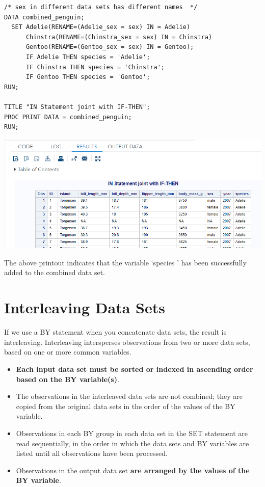 \documentclass[
]{book}
\begin{document}
\begin{verbatim}
/* sex in different data sets has different names  */
DATA combined_penguin;
  SET Adelie(RENAME=(Adelie_sex = sex) IN = Adelie)
      Chinstra(RENAME=(Chinstra_sex = sex) IN = Chinstra)
      Gentoo(RENAME=(Gentoo_sex = sex) IN = Gentoo);
      IF Adelie THEN species = 'Adelie';
      IF Chinstra THEN species = 'Chinstra';
      IF Gentoo THEN species = 'Gentoo';
RUN; 

TITLE "IN Statement joint with IF-THEN";
PROC PRINT DATA = combined_penguin;
RUN;
\end{verbatim}

\begin{center}\includegraphics[width=1\linewidth]{img08/w08-IN-Indicator-IF-THEN} \end{center}

The above printout indicates that the variable `species ' has been successfully added to the combined data set.

\hypertarget{interleaving-data-sets}{%
\section{Interleaving Data Sets}\label{interleaving-data-sets}}

If we use a BY statement when you concatenate data sets, the result is interleaving. Interleaving intersperses observations from two or more data sets, based on one or more common variables.

\begin{itemize}
\item
  \textbf{Each input data set must be sorted or indexed in ascending order based on the BY variable(s)}.
\item
  The observations in the interleaved data sets are not combined; they are copied from the original data sets in the order of the values of the BY variable.
\item
  Observations in each BY group in each data set in the SET statement are read sequentially, in the order in which the data sets and BY variables are listed until all observations have been processed.
\item
  Observations in the output data set \textbf{are arranged by the values of the BY variable}.
\end{itemize}
\end{document}
